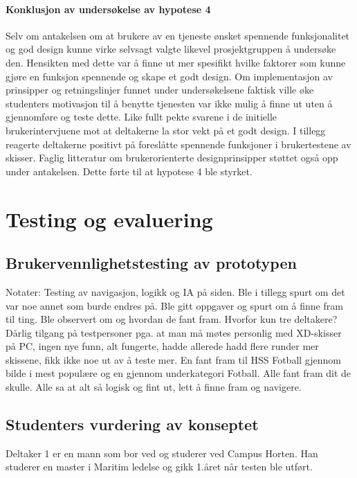 \paragraph{Konklusjon av undersøkelse av hypotese 4}
Selv om antakelsen om at brukere av en tjeneste ønsket spennende funksjonalitet og god design kunne virke selvsagt valgte likevel prosjektgruppen å undersøke den. Hensikten med dette var å finne ut mer spesifikt hvilke faktorer som kunne gjøre en funksjon spennende og skape et godt design. Om implementasjon av prinsipper og retningslinjer funnet under undersøkelsene faktisk ville øke studenters motivasjon til å benytte tjenesten var ikke mulig å finne ut uten å gjennomføre og teste dette. Like fullt pekte svarene i de initielle brukerintervjuene mot at deltakerne la stor vekt på et godt design. I tillegg reagerte deltakerne positivt på foreslåtte spennende funksjoner i brukertestene av skisser. Faglig litteratur om brukerorienterte designprinsipper støttet også opp under antakelsen. Dette førte til at hypotese 4 ble styrket.


\section{Testing og evaluering}

\subsection{Brukervennlighetstesting av prototypen}

Notater:
Testing av navigasjon, logikk og IA på siden.
Ble i tillegg spurt om det var noe annet som burde endres på.
Ble gitt oppgaver og spurt om å finne fram til ting.
Ble observert om og hvordan de fant fram.
Hvorfor kun tre deltakere? Dårlig tilgang på testpersoner pga. at man må møtes personlig med XD-skisser på PC, ingen nye funn, alt fungerte, hadde allerede hadd flere runder mer skissene, fikk ikke noe ut av å teste mer.
En fant fram til HSS Fotball gjennom bilde i mest populære og en gjennom underkategori Fotball.
Alle fant fram dit de skulle.
Alle sa at alt så logisk og fint ut, lett å finne fram og navigere.

\subsection{Studenters vurdering av konseptet}
Deltaker 1 er en mann som bor ved og studerer ved Campus Horten. Han studerer en master i Maritim ledelse og gikk 1.året når testen ble utført.

